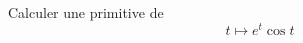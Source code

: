 Calculer une primitive de
\begin{displaymath}
  t \mapsto  e^{t} \cos t
\end{displaymath}
\bigskip \bigskip 